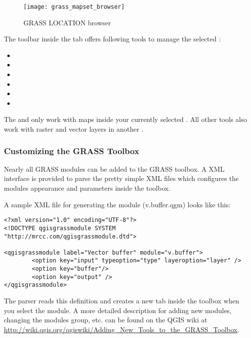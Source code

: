 \begin{figure}[h]
 \begin{center}
 \caption{GRASS LOCATION browser \nixcaption}\label{fig:grass_mapset_browser}
 \texttt{[image: grass\_mapset\_browser]}
 \end{center}
\end{figure}

The toolbar inside the  tab offers following tools to manage 
the selected :

\begin{itemize}
\item {}
\item {}
\item {}
\item {}
\item {}
\item {}
\end{itemize}

The  and 
 only work with maps inside 
your currently selected . All other tools also work with 
raster and vector layers in another .

\subsubsection{Customizing the GRASS Toolbox} 
\label{sec:toolbox-customizing}

Nearly all GRASS modules can be added to the GRASS toolbox. A XML 
interface is provided to parse the pretty simple XML files which configures 
the modules appearance and parameters inside the toolbox.

A sample XML file for generating the module  (v.buffer.qgm) 
looks like this:
\begin{verbatim}
<?xml version="1.0" encoding="UTF-8"?>
<!DOCTYPE qgisgrassmodule SYSTEM "http://mrcc.com/qgisgrassmodule.dtd">

<qgisgrassmodule label="Vector buffer" module="v.buffer">
        <option key="input" typeoption="type" layeroption="layer" />
        <option key="buffer"/>
        <option key="output" />
</qgisgrassmodule>
\end{verbatim}

The parser reads this definition and creates a new tab inside the toolbox 
when you select the module. A more detailed description for adding new 
modules, changing the modules group, etc. can be found on the QGIS wiki at \\
\url{http://wiki.qgis.org/qgiswiki/Adding\_New\_Tools\_to\_the\_GRASS\_Toolbox}.

